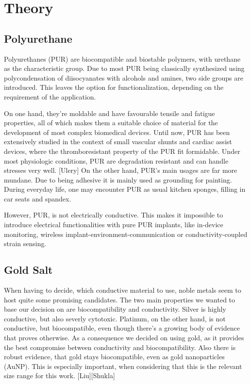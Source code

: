 \section{Theory}

\subsection{Polyurethane}

Polyurethanes (PUR) are biocompatible and biostable polymers, with urethane as the characteristic group. Due to most PUR being classically synthesized using polycondensation of diisocyanates with alcohols and amines, two side groups are introduced. This leaves the option for functionalization, depending on the requirement of the application. 

On one hand, they're moldable and have favourable tensile and fatigue properties, all of which makes them a suitable choice of material for the development of most complex biomedical devices. Until now, PUR has been extensively studied in the context of small vascular shunts and cardiac assist devices, where the thromboresistant property of the PUR fit formidable. Under most physiologic conditions, PUR are degradation resistant and can handle stresses very well. [Ulery] 
On the other hand, PUR's main usages are far more mundane. Due to being adhesive it is mainly used as grounding for painting. During everyday life, one may encounter PUR as usual kitchen sponges, filling in car seats and spandex.

However, PUR, is not electrically conductive. This makes it impossible to introduce electrical functionalities with pure PUR implants, like in-device monitoring, wireless implant-environment-communication or conductivity-coupled strain sensing.


\subsection{Gold Salt}

When having to decide, which conductive material to use, noble metals seem to host quite some promising candidates. The two main properties we wanted to base our decision on are biocompatibility and conductivity. Silver is highly conductive, but also severly cytotoxic. Platinum, on the other hand, is not conductive, but biocompatible, even though there's a growing body of evidence that proves otherwise. As a consequence we decided on using gold, as it provides the best compromise between conductivity and biocompatibility. Also there is robust evidence, that gold stays biocompatible, even as gold nanoparticles (AuNP). This is especially important, when considering that this is the relevant size range for this work. [Liu][Shukla]

